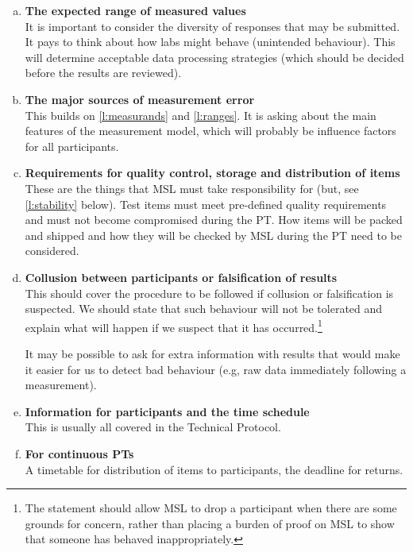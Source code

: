 \begin{enumerate}[a)]
\item	\textbf{The expected range of measured values} \\ \label{l:ranges}%
It is important to consider the diversity of responses that may be submitted. It pays to think about how labs might behave (unintended behaviour). This will determine acceptable data processing strategies (which should be decided before the results are reviewed).

\item	\textbf{The major sources of measurement error} \\
This builds on \ref{l:measurands} and \ref{l:ranges}. It is asking about the main features of the measurement model, which will probably be influence factors for all participants.


\item	\textbf{Requirements for quality control, storage and distribution of items} \\ \label{l:QA_requirements} 
These are the things that MSL must take responsibility for (but, see \ref{l:stability} below). Test items must meet pre-defined quality requirements and must not become compromised during the PT. How items will be packed and shipped and how they will be checked by MSL during the PT need to be considered.


\item	\textbf{Collusion between participants or falsification of results}  \\
This should cover the procedure to be followed if collusion or falsification is suspected. We should state that such behaviour will not be tolerated and explain what will happen if we suspect that it has occurred.\footnote{The statement should allow MSL to drop a participant when there are some grounds for concern, rather than placing a burden of proof on MSL to show that someone has behaved inappropriately.} 
 
It may be possible to ask for extra information with results that would make it easier for us to detect bad behaviour (e.g, raw data immediately following a measurement).


\item	\textbf{Information for participants and the time schedule}  \\
This is usually all covered in the Technical Protocol.

\item	\textbf{For continuous PTs} \\ 
A timetable for distribution of items to participants, the deadline for returns.


\end{enumerate}
